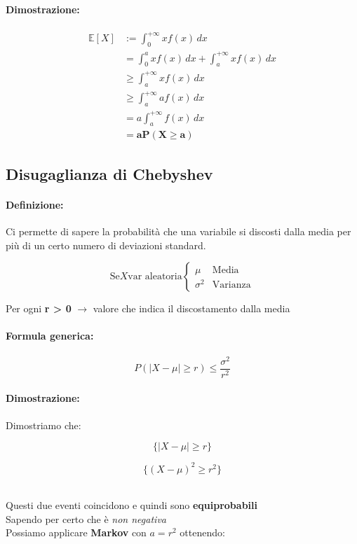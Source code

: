 \documentclass[]{article}
\newcommand{\ev}{\mathbb{E}[X]}
\renewcommand{\ev}[1]{\mathbb{E}[#1]}
\newcommand{\definizione}{\paragraph{Definizione:}}
\newcommand{\formula}{\paragraph{Formula generica:}}
\begin{document}
    \paragraph{Dimostrazione:}
    \begin{equation*}
        \begin{split}
            \ev{X} & := \int_{0}^{+\infty} xf(x) \, dx \\
            & = \int_{0}^{a} x f(x) \, dx + \int_{a}^{+\infty} x f(x) \, dx \\ 
            & \geq \int_{a}^{+\infty} x f(x) \, dx \\ 
            & \geq \int_{a}^{+\infty} a f(x) \, dx \\
            & = a \int_{a}^{+\infty} f(x) \, dx \\ 
            & = \boldsymbol{aP(X \geq a)}
        \end{split}
    \end{equation*}
    
    \subsection{Disugaglianza di Chebyshev}
    \definizione Ci permette di sapere la probabilità che una variabile si discosti dalla media per più di un certo numero di deviazioni standard.
    
    \begin{equation*}
        \text{Se} X \text{var aleatoria}
        \begin{cases}
            \mu & \text{Media} \\
            \sigma^2 & \text{Varianza}
        \end{cases}
    \end{equation*}

    \centerline{Per ogni \textbf{r > 0} $\longrightarrow$ valore che indica il discostamento dalla media}
    \formula 
    \[ P(|X - \mu| \geq r) \leq \frac{\sigma^2}{r^2} \]

    \paragraph{Dimostrazione:} Dimostriamo che: \\
    \begin{minipage}{0.45\linewidth}
        \[ \{ |X - \mu | \geq r \} \]
    \end{minipage}
    \begin{minipage}{0.45\linewidth}
        \[ \{ ( X - \mu )^2 \geq r^2 \} \]
    \end{minipage} \\
    \linebreak[4]
    Questi due eventi coincidono e quindi sono \textbf{equiprobabili} \\
    Sapendo per certo che  è \textit{non negativa} \\
    Possiamo applicare \textbf{Markov} con $a = r^2$ ottenendo:
\end{document}
